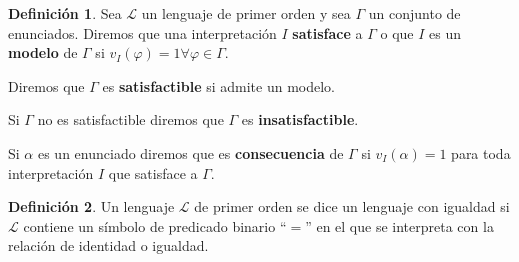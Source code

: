 \documentclass[a4paper,11pt]{article}
\theoremstyle{definition}
\newtheorem{defn}{Definición}[section]
\theoremstyle{remark}
\def\LL{\ensuremath{\mathcal{L}}}
\begin{document}
\begin{defn}
    Sea $\LL$ un lenguaje de primer orden y sea $\Gamma$ un conjunto de
    enunciados. Diremos que una interpretación $I$ \textbf{satisface}
    a $\Gamma$ o que $I$ es un \textbf{modelo} de $\Gamma$ si
    $v_I(\varphi) = 1 \forall \varphi \in \Gamma$.
    
    Diremos que $\Gamma$ es \textbf{satisfactible} si admite un modelo.
    
    Si $\Gamma$ no es satisfactible diremos que $\Gamma$ es
    \textbf{insatisfactible}.
    
    Si $\alpha$ es un enunciado diremos que es \textbf{consecuencia} de $\Gamma$
    si $v_I(\alpha) = 1$ para toda interpretación $I$ que satisface a $\Gamma$.
\end{defn}

\begin{defn}
    Un lenguaje $\LL$ de primer orden se dice un lenguaje con igualdad
    si $\LL$ contiene un símbolo de predicado binario ``$=$'' en el que
    se interpreta con la relación de identidad o igualdad.
\end{defn}
\end{document}
